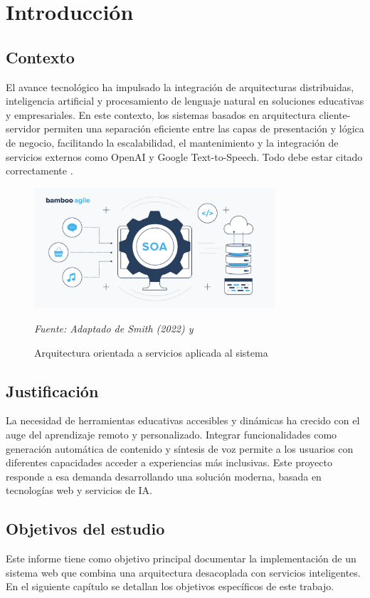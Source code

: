 \chapter{Introducción}

\section{Contexto}

El avance tecnológico ha impulsado la integración de arquitecturas distribuidas, inteligencia artificial y procesamiento de lenguaje natural en soluciones educativas y empresariales. En este contexto, los sistemas basados en arquitectura cliente-servidor permiten una separación eficiente entre las capas de presentación y lógica de negocio, facilitando la escalabilidad, el mantenimiento y la integración de servicios externos como OpenAI y Google Text-to-Speech. Todo debe estar citado correctamente \cite{doe2023}.

\begin{figure}[ht]
  \centering
  \includegraphics[width=0.8\textwidth]{imagenes/soa.png}
  \caption{Arquitectura orientada a servicios aplicada al sistema}
  \label{fig:ejemplo}
  \vspace{0.3cm}
  \small \textit{Fuente: Adaptado de Smith (2022) y \cite{doe2023}}
\end{figure}

\section{Justificación}

La necesidad de herramientas educativas accesibles y dinámicas ha crecido con el auge del aprendizaje remoto y personalizado. Integrar funcionalidades como generación automática de contenido y síntesis de voz permite a los usuarios con diferentes capacidades acceder a experiencias más inclusivas. Este proyecto responde a esa demanda desarrollando una solución moderna, basada en tecnologías web y servicios de IA.

\section{Objetivos del estudio}

Este informe tiene como objetivo principal documentar la implementación de un sistema web que combina una arquitectura desacoplada con servicios inteligentes. En el siguiente capítulo se detallan los objetivos específicos de este trabajo.
